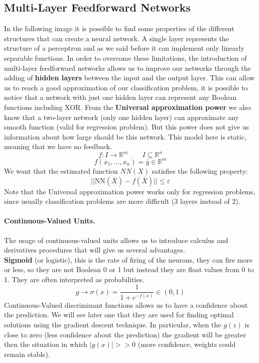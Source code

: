 \subsection{Multi-Layer Feedforward Networks}
In the following image it is possible to find some properties of the different structures that can create a neural network.
A single layer represents the structure of a perceptron and as we said before it can implement only linearly separable functions. In order to overcome these limitations, the introduction of multi-layer feedforward networks allows us to improve our networks through the adding of \textbf{hidden layers} between the input and the output layer. This can allow us to reach a good approximation of our classification problem, it is possible to notice that a network with just one hidden layer can represent any Boolean functions including XOR. From the \textbf{Universal approximation power} we also know that a two-layer network (only one hidden layer) can approximate any smooth function (valid for regression problem). But this power does not give us information about how large should be this network. This model here is static, meaning that we have no feedback.
$$f: I \rightarrow \mathbb{ R }^m \qquad I \subseteq \mathbb{ R }^n$$
$$f(x_1,\dots,x_n) = \bar{y}\in \mathbb{ R }^m$$
We want that the estimated function $NN(X)$ satisfies the following property:
$$||\text{NN}(\bar X)- f(\bar X)|| \leq \varepsilon$$
		
Note that the Universal approximation power works only for regression problems, since usually classification problems are more difficult (3 layers instead of 2).

\paragraph*{Continuous-Valued Units.} The usage of continuous-valued units allows us to introduce calculus and derivatives procedures that will give us several advantages.\\ 
\textbf{Sigmoid} (or logistic), this is the rate of firing of the neurons, they can fire more or less, so they are not Boolean 0 or 1 but instead they are float values from 0 to 1. They are often interpreted as probabilities.
$$g \rightarrow \sigma(x) = \frac{1}{1+e^{-f(x)}} \in (0,1)$$
Continuous-Valued discriminant functions allows us to have a confidence about the prediction. We will see later one that they are used for finding optimal solutions using the gradient descent technique. In particular, when the $g(z)$ is close to zero (less confidence about the prediction) the gradient will be greater then the situation in which $|g(x)| >> 0$ (more confidence, weights could remain stable).\\

